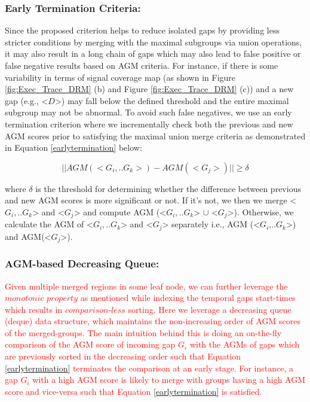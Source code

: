 \documentclass[acmsmall]{acmart}
\begin{document}
\subsubsection{Early Termination Criteria:}
\label{subsubsection:Caching}

Since the proposed criterion helps to reduce isolated gaps by providing less stricter conditions by merging with the maximal subgroups via union operations, it may also result in a long chain of gaps which may also lead to false positive or false negative results based on AGM criteria. For instance, if there is some variability in terms of signal coverage map (as shown in Figure \ref{fig:Exec_Trace_DRM} (b) and Figure \ref{fig:Exec_Trace_DRM} (c)) and a new gap (e.g., <$D$>) may fall below the defined threshold and the entire maximal subgroup may not be abnormal. To avoid such false negatives, we use an early termination criterion where we incrementally check both the previous and new AGM scores prior to satisfying the maximal union merge criteria as demonstrated in Equation \ref{earlytermination} below: 

\begin{equation}
\label{earlytermination}
    || AGM (<G_{i},..G_{k}>) - AGM(<G_{j}>) || \geq \delta
\end{equation}

where $\delta$ is the threshold for determining whether the difference between previous and new AGM scores is more significant or not. If it's not, we then we merge <$G_{i},..G_{k}$> and <$G_{j}$> and compute AGM (<$G_{i},..G_{k}$> $\cup$ <$G_{j}$>). Otherwise, we calculate the AGM of <$G_{i},..G_{k}$> and <$G_{j}$> separately i.e., AGM (<$G_{i}$,..$G_{k}$>) and AGM(<$G_{j}$>). 


\subsubsection{AGM-based Decreasing Queue:} 
\label{subsubsection:Caching}

\textcolor{red}{Given multiple merged regions in some leaf node, we can further leverage the $\textit{monotonic property}$ as mentioned while indexing the temporal gaps start-times which results in $\textit{comparison-less}$ sorting. Here we leverage a decreasing queue (deque) data structure, which maintains the non-increasing order of AGM scores of the merged-groups. The main intuition behind this is doing an on-the-fly comparison of the AGM score of incoming gap $G_{i}$ with the AGMs of gaps which are previously sorted in the decreasing order such that Equation \ref{earlytermination} terminates the comparison at an early stage. For instance, a gap $G_{i}$ with a high AGM score is likely to merge with groups having a high AGM score and vice-versa such that Equation \ref{earlytermination} is satisfied.}
\end{document}

